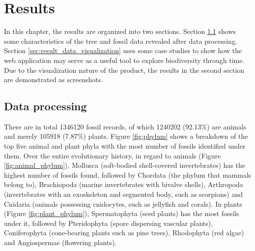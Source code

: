 \documentclass[11pt, a4paper,oneside,chapterprefix=false]{scrbook}
\begin{document}
\chapter{Results} \label{chp:results}
In this chapter, the results are organized into two sections. Section \ref{sec:result_data_processing} shows some characteristics of the tree and fossil data revealed after data processing. Section \ref{sec:result_data_visualization} uses some case studies to show how the web application may serve as a useful tool to explore biodiversity through time. Due to the visualization nature of the product, the results in the second section are demonstrated as screenshots.

\section{Data processing} \label{sec:result_data_processing}
There are in total 1346120 fossil records, of which 1240202 (92.13\%) are animals and merely 105918 (7.87\%) plants. Figure \ref{fig:phylum} shows a breakdown of the top five animal and plant phyla with the most number of fossils identified under them. Over the entire evolutionary history, in regard to animals (Figure \ref{fig:animal_phylum}), Mollusca (soft-bodied shell-covered invertebrates) has the highest number of fossils found, followed by Chordata (the phylum that mammals belong to), Brachiopoda (marine invertebrates with bivalve shells), Arthropoda (invertebrates with an exoskeleton and segmented body, such as scorpions) and Cnidaria (animals possessing cnidocytes, such as jellyfish and corals). In plants (Figure \ref{fig:plant_phylum}), Spermatophyta (seed plants) has the most fossils under it, followed by Pteridophyta (spore dispersing vascular plants), Coniferophyta (cone-bearing plants such as pine trees), Rhodophyta (red algae) and Angiospermae (flowering plants).
\end{document}
